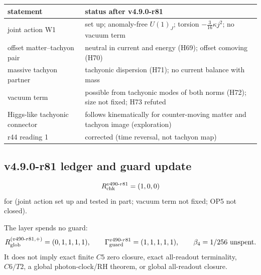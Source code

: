 \begin{center}
\small
\begin{tabular}{@{}>{\raggedright\arraybackslash}p{}>{\raggedright\arraybackslash}p{}@{}}
\toprule
statement & status after v4.9.0-r81\\
\midrule
joint action W1 & set up; anomaly-free \(U(1)_J\); torsion \(-\tfrac3{16}\kappa j^2\); no vacuum term\\
offset matter--tachyon pair & neutral in current and energy (H69); offset comoving (H70)\\
massive tachyon partner & tachyonic dispersion (H71); no current balance with mass\\
vacuum term & possible from tachyonic modes of both norms (H72); size not fixed; H73 refuted\\
Higgs-like tachyonic connector & follows kinematically for counter-moving matter and tachyon image (exploration)\\
r44 reading 1 & corrected (time reversal, not tachyon map)\\
\bottomrule
\end{tabular}
\end{center}

\subsection*{v4.9.0-r81 ledger and guard update}
\label{subsec:v490-r81-ledger-guard}

\[
R_{\rm chk}^{v490\text{-}r81}=(1,0,0)
\]
for (joint action set up and tested in part; vacuum term not fixed; OP5 not closed).

The layer spends no guard:
\[
R_{\rm glob}^{(v490\text{-}r81,+)}=(0,1,1,1,1),
\qquad
\Gamma_{\rm guard}^{v490\text{-}r81}=(1,1,1,1,1),
\qquad
\beta_4=1/256\ \text{unspent}.
\]
It does not imply exact finite \(C5\) zero closure, exact all-readout terminality,
\(C6/T2\), a global photon-clock/RH theorem, or global all-readout closure.
